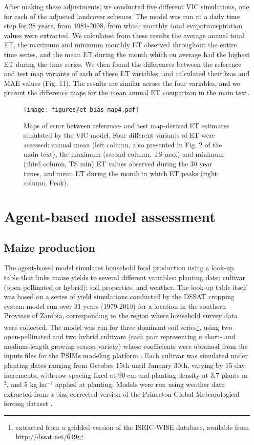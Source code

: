\documentclass[11pt, titlepage]{article}
\begin{document}
After making these adjustments, we conducted five different VIC simulations, one for each of the adjusted landcover schemes. The model was run at a daily time step for 28 years, from 1981-2008, from which monthly total evapotranspiration values were extracted.  We calculated from these results the average annual total ET, the maximum and minimum monthly ET observed throughout the entire time series, and the mean ET during the month which on average had the highest ET during the time series. We then found the differences between the reference and test map variants of each of these ET variables, and calculated their bias and MAE values (Fig. 11). The results are similar across the four variables, and we present the difference maps for the mean annual ET comparison in the main text.  

\begin{figure}[ht]
  \centering
     \texttt{[image: figures/et\_bias\_map4.pdf]} 
      \caption{Maps of error between reference- and test map-derived ET estimates simulated by the VIC model. Four different variants of ET were assessed: annual mean (left column, also presented in Fig. 2 of the main text), the maximum (second column, TS max) and minimum (third column, TS min) ET values observed during the 30 year times, and mean ET during the month in which ET peaks (right column, Peak).}
      \label{fig:default}
\end{figure}


\section{\large Agent-based model assessment}

\subsection{\large Maize production}
The agent-based model simulates household food production using a look-up table that links maize yields to several different variables: planting date; cultivar (open-pollinated or hybrid); soil properties, and weather.  The look-up table itself was based on a series of yield simulations conducted by the DSSAT cropping system model run over 31 years (1979-2010) for a location in the southern Province of Zambia, corresponding to the region where household survey data were collected. The model was run for three dominant soil series\footnote{extracted from a gridded version of the ISRIC-WISE database, available from http://dssat.net/649}, using two open-pollinated and two hybrid cultivars (each pair representing a short- and medium-length growing season variety) whose coefficients were obtained from the inputs files for the PSIMs modeling platform \citep{elliott_parallel_2014}. Each cultivar was simulated under planting dates ranging from October 15th until January 30th, varying by 15 day increments, with row spacing fixed at 90 cm and planting density at 3.7 plants m$^2$, and 5 kg ha$^{-1}$ applied at planting. Models were run using weather data extracted from a bias-corrected version of the Princeton Global Meteorological forcing dataset \citep{sheffield_development_2006,chaney_spatial_2014,estes_changing_2014}.  
\end{document}
